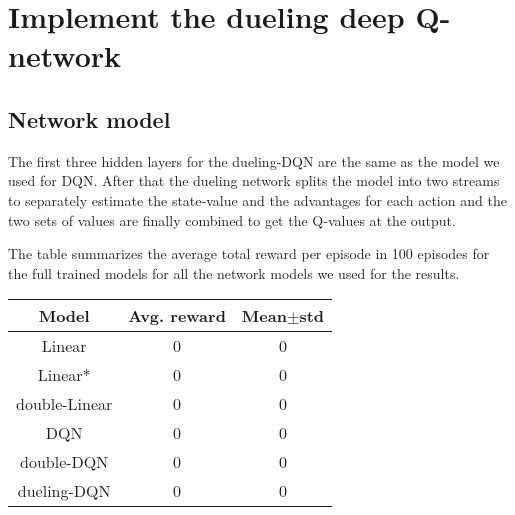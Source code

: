 \documentclass{article}
\begin{document}

\section*{Implement the dueling deep Q-network}
\subsection*{Network model}
The first three hidden layers for the dueling-DQN are the same as the model we used for DQN. After that the dueling network splits the model into two streams to separately estimate the state-value and the advantages for each action and the two sets of values are finally combined to get the Q-values at the output.


The table summarizes the average total reward per episode in 100 episodes for the full trained models for all the network models we used for the results.
\begin{center}
 \begin{tabular}{||c | c c||} 
 \hline
 Model & Avg. reward & Mean$\pm$std \\ [0.5ex] 
 \hline\hline
 Linear & 0 & 0 \\ 
 \hline
 Linear* & 0 & 0 \\
 \hline
 double-Linear & 0 & 0 \\
 \hline
 DQN & 0 & 0 \\
 \hline
 double-DQN & 0 & 0 \\  
 \hline
 dueling-DQN & 0 & 0 \\ 
 \hline
\end{tabular}
\end{center}
\end{document}
